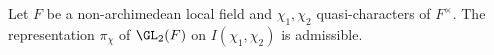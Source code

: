 Let $F$ be a non-archimedean local field and $\chi_1,\chi_2$ quasi-characters of $F^\times$. The representation
$\pi_\chi$ of $\GL_2(F)$ on $I(\chi_1,\chi_2)$ is admissible.
